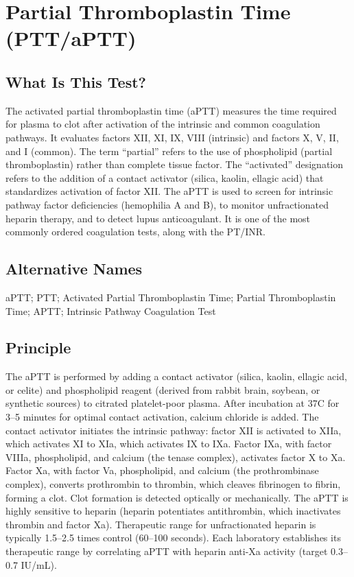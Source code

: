 \chapter{Partial Thromboplastin Time (PTT/aPTT)}

\section*{What Is This Test?}
The activated partial thromboplastin time (aPTT) measures the time required for plasma to clot after activation of the intrinsic and common coagulation pathways. It evaluates factors XII, XI, IX, VIII (intrinsic) and factors X, V, II, and I (common). The term ``partial'' refers to the use of phospholipid (partial thromboplastin) rather than complete tissue factor. The ``activated'' designation refers to the addition of a contact activator (silica, kaolin, ellagic acid) that standardizes activation of factor XII. The aPTT is used to screen for intrinsic pathway factor deficiencies (hemophilia A and B), to monitor unfractionated heparin therapy, and to detect lupus anticoagulant. It is one of the most commonly ordered coagulation tests, along with the PT/INR.

\section*{Alternative Names}
aPTT; PTT; Activated Partial Thromboplastin Time; Partial Thromboplastin Time; APTT; Intrinsic Pathway Coagulation Test

\section*{Principle}
The aPTT is performed by adding a contact activator (silica, kaolin, ellagic acid, or celite) and phospholipid reagent (derived from rabbit brain, soybean, or synthetic sources) to citrated platelet-poor plasma. After incubation at 37\textdegree{}C for 3--5 minutes for optimal contact activation, calcium chloride is added. The contact activator initiates the intrinsic pathway: factor XII is activated to XIIa, which activates XI to XIa, which activates IX to IXa. Factor IXa, with factor VIIIa, phospholipid, and calcium (the tenase complex), activates factor X to Xa. Factor Xa, with factor Va, phospholipid, and calcium (the prothrombinase complex), converts prothrombin to thrombin, which cleaves fibrinogen to fibrin, forming a clot. Clot formation is detected optically or mechanically. The aPTT is highly sensitive to heparin (heparin potentiates antithrombin, which inactivates thrombin and factor Xa). Therapeutic range for unfractionated heparin is typically 1.5--2.5 times control (60--100 seconds). Each laboratory establishes its therapeutic range by correlating aPTT with heparin anti-Xa activity (target 0.3--0.7 IU/mL).

